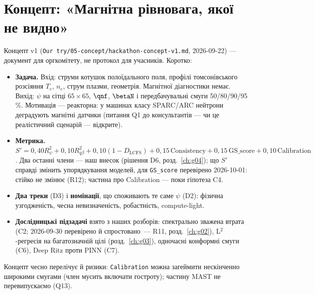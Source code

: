 \section{Концепт: «Магнітна рівновага, якої не видно»}\label{sec:g01-concept}

Концепт v1 (\texttt{Our try/05-concept/\allowbreak hackathon-concept-v1.md}, 2026-09-22) ---
документ для оргкомітету, не протокол для учасників. Коротко:
\begin{itemize}
\item \textbf{Задача.} Вхід: струми котушок полоїдального поля, профілі томсонівського
  розсіяння $T_e$, $n_e$, струм плазми, геометрія. Магнітної діагностики немає. Вихід:
  $\psi$ на сітці $65\times65$, $\qnf$, $\betaN$ і передбачувальні смуги 50/80/90/95\,\%.
  Мотивація --- реакторна: у машинах класу SPARC/ARC нейтрони деградують магнітні датчики
  (питання Q1 до консультантів --- чи це реалістичний сценарій --- відкрите).
\item \textbf{Метрика.}
  $S' = 0{,}40R^2_\psi + 0{,}10R^2_{q\beta} + 0{,}10(1-D_{\mathrm{LCFS}})
  + 0{,}15\,\mathrm{Consistency} + 0{,}15\,\mathrm{GS\_score} + 0{,}10\,\mathrm{Calibration}$.
  Два останні члени --- наш внесок (рішення D6, розд.~\ref{ch:g04}); що $S'$ справді
  змінить упорядкування моделей, для \texttt{GS\_score} перевірено 2026-10-01: стійко не змінює (R12); частина про Calibration --- поки гіпотеза C4.
\item \textbf{Два треки} (D3) і \textbf{номінації}, що споживають те саме $\psi$ (D2):
  фізична узгодженість, чесна невизначеність, робастність, compute-light.
\item \textbf{Дослідницькі підзадачі} взято з наших розборів: спектрально зважена втрата
  (C2; 2026-09-30 перевірено й спростовано~--- R11, розд.~\ref{ch:g02}), L$^2$-регресія на багатозначній цілі (розд.~\ref{ch:g03}),
  одночасні конформні смуги (C6), Deep Ritz проти PINN (C7).
\end{itemize}
Концепт чесно перелічує й ризики: \texttt{Calibration} можна загеймити нескінченно
широкими смугами (член мусить включати гостроту); частину MAST не перевипускаємо (Q13).

